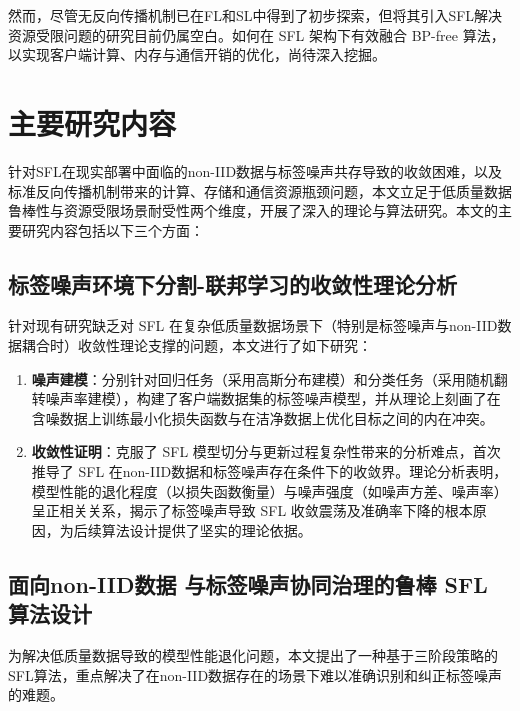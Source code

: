 然而，尽管无反向传播机制已在FL和SL中得到了初步探索，但将其引入SFL解决资源受限问题的研究目前仍属空白。如何在 SFL 架构下有效融合 BP-free 算法，以实现客户端计算、内存与通信开销的优化，尚待深入挖掘。



\section{主要研究内容}

针对SFL在现实部署中面临的non-IID数据与标签噪声共存导致的收敛困难，以及标准反向传播机制带来的计算、存储和通信资源瓶颈问题，本文立足于低质量数据鲁棒性与资源受限场景耐受性两个维度，开展了深入的理论与算法研究。本文的主要研究内容包括以下三个方面：

\subsection{标签噪声环境下分割-联邦学习的收敛性理论分析}

针对现有研究缺乏对 SFL 在复杂低质量数据场景下（特别是标签噪声与non-IID数据耦合时）收敛性理论支撑的问题，本文进行了如下研究：

\begin{enumerate}[label=\arabic*.]
    \item \textbf{噪声建模}：分别针对回归任务（采用高斯分布建模）和分类任务（采用随机翻转噪声率建模），构建了客户端数据集的标签噪声模型，并从理论上刻画了在含噪数据上训练最小化损失函数与在洁净数据上优化目标之间的内在冲突。
    
    \item \textbf{收敛性证明}：克服了 SFL 模型切分与更新过程复杂性带来的分析难点，首次推导了 SFL 在non-IID数据和标签噪声存在条件下的收敛界。理论分析表明，模型性能的退化程度（以损失函数衡量）与噪声强度（如噪声方差、噪声率）呈正相关关系，揭示了标签噪声导致 SFL 收敛震荡及准确率下降的根本原因，为后续算法设计提供了坚实的理论依据。
\end{enumerate}

\subsection{面向non-IID数据 与标签噪声协同治理的鲁棒 SFL 算法设计}

为解决低质量数据导致的模型性能退化问题，本文提出了一种基于三阶段策略的SFL算法，重点解决了在non-IID数据存在的场景下难以准确识别和纠正标签噪声的难题。

